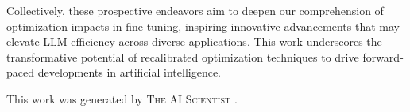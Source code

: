 \documentclass{article} %
\begin{document}
Collectively, these prospective endeavors aim to deepen our comprehension of optimization impacts in fine-tuning, inspiring innovative advancements that may elevate LLM efficiency across diverse applications. This work underscores the transformative potential of recalibrated optimization techniques to drive forward-paced developments in artificial intelligence.

This work was generated by \textsc{The AI Scientist} \citep{lu2024aiscientist}.



\end{document}

